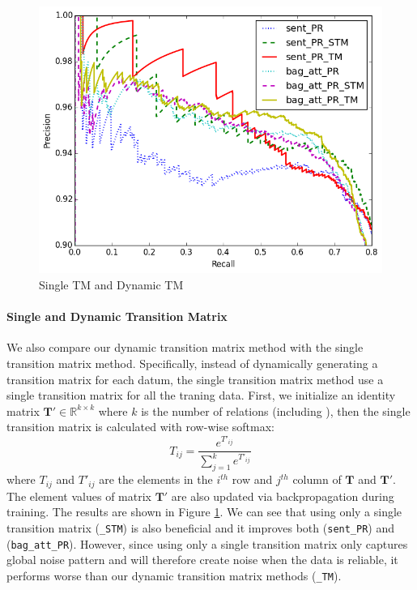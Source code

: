 \begin{figure}[htbp]
\begin{center}
\includegraphics[width=0.9\linewidth]{figures/single_cmp_exp_overall.png}
\caption{Single TM and Dynamic TM}
\label{fig: cmp_single_dynamic}
\end{center}
\end{figure}

\paragraph{Single and Dynamic Transition Matrix}
We also compare our dynamic transition matrix method with the single transition matrix method. 
Specifically, instead of dynamically generating a transition matrix for each datum, the single transition matrix method use a single transition matrix for all the traning data. First, we initialize an identity matrix $\mathbf{T}'\in\mathbb{R}^{k\times k}$ where $k$ is the number of relations (including ), then the single transition matrix is calculated with row-wise softmax:
\begin{equation}
\label{shared_mat}
T_{ij} = \frac{e^{T'_{ij}}}{\sum_{j=1}^{k}{e^{T'_{ij}}}}
\end{equation}
where $T_{ij}$ and $T'_{ij}$ are the elements in the $i^{th}$ row and $j^{th}$ column of $\mathbf{T}$ and $\mathbf{T}'$. The element values of matrix $\mathbf{T}'$ are also updated via backpropagation during training.
The results are shown in Figure \ref{fig: cmp_single_dynamic}.
We can see that using only a single transition matrix (\texttt{\_STM}) is also beneficial and it improves both (\texttt{sent\_PR}) and (\texttt{bag\_att\_PR}). However, since using only a single transition matrix only captures global noise pattern and will therefore create noise when the data is reliable, it performs worse than our dynamic transition matrix methods (\texttt{\_TM}).

